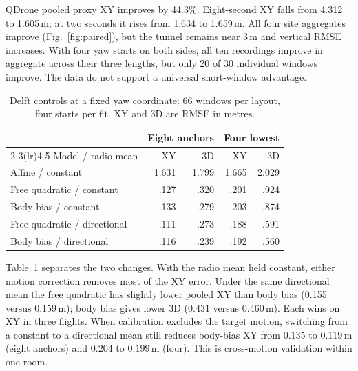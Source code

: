 \documentclass[conference,letterpaper,10pt]{IEEEtran}
\begin{document}
QDrone pooled proxy XY improves by 44.3\%. Eight-second XY falls from 4.312 to 1.605\,m; at two seconds it rises from 1.634 to 1.659\,m. All four site aggregates improve (Fig.~\ref{fig:paired}), but the tunnel remains near 3\,m and vertical RMSE increases. With four yaw starts on both sides, all ten recordings improve in aggregate across their three lengths, but only 20 of 30 individual windows improve. The data do not support a universal short-window advantage.

\begin{table}[t]
\caption{Delft controls at a fixed yaw coordinate: 66 windows per layout, four starts per fit. XY and 3D are RMSE in metres.}
\label{tab:model}\centering\small
\begin{tabular}{lrrrr}
\toprule
&\multicolumn{2}{c}{Eight anchors}&\multicolumn{2}{c}{Four lowest}\\
\cmidrule(lr){2-3}\cmidrule(lr){4-5}
Model / radio mean&XY&3D&XY&3D\\\midrule
Affine / constant&1.631&1.799&1.665&2.029\\
Free quadratic / constant&.127&.320&.201&.924\\
Body bias / constant&.133&.279&.203&.874\\
Free quadratic / directional&.111&.273&.188&.591\\
Body bias / directional&.116&.239&.192&.560\\
\bottomrule\end{tabular}
\end{table}
Table~\ref{tab:model} separates the two changes. With the radio mean held constant, either motion correction removes most of the XY error. Under the same directional mean the free quadratic has slightly lower pooled XY than body bias (0.155 versus 0.159\,m); body bias gives lower 3D (0.431 versus 0.460\,m). Each wins on XY in three flights. When calibration excludes the target motion, switching from a constant to a directional mean still reduces body-bias XY from $0.135$ to $0.119$\,m (eight anchors) and $0.204$ to $0.199$\,m (four). This is cross-motion validation within one room.
\end{document}
